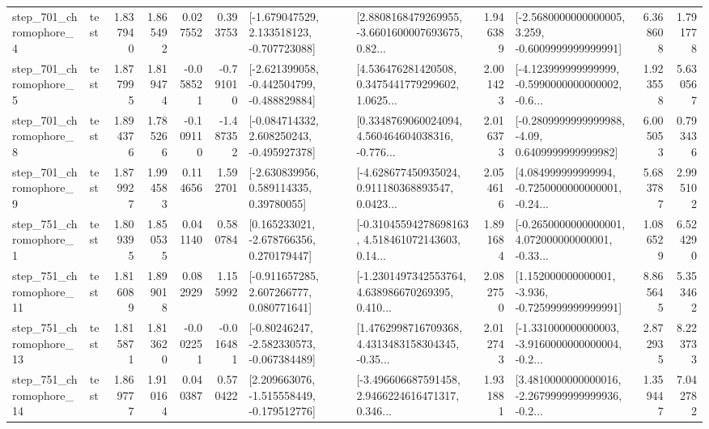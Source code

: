 \begin{tabular}{llrrrrllrlrr}
   step\_701\_chromophore\_4 &      test &      1.837940 &    1.865492 &      0.027552 &  0.393753 &   [-1.679047529, 2.133518123, -0.707723088] &  [2.8808168479269955, -3.6601600007693675, 0.82... &       1.946389 &  [-2.5680000000000005, 3.259, -0.6009999999999991] &            6.368608 &          1.791778 \\
   step\_701\_chromophore\_5 &      test &      1.877995 &    1.819474 &     -0.058521 & -0.791010 &  [-2.621399058, -0.442504799, -0.488829884] &  [4.536476281420508, 0.3475441779299602, 1.0625... &       2.001423 &  [-4.123999999999999, -0.5990000000000002, -0.6... &            1.923558 &          5.630567 \\
   step\_701\_chromophore\_8 &      test &      1.894376 &    1.785266 &     -0.109110 & -1.487352 &   [-0.084714332, 2.608250243, -0.495927378] &  [0.3348769060024094, 4.560464604038316, -0.776... &       2.016373 &   [-0.2809999999999988, -4.09, 0.6409999999999982] &            6.005053 &          0.793436 \\
   step\_701\_chromophore\_9 &      test &      1.879927 &    1.994583 &      0.114656 &  1.592701 &     [-2.630839956, 0.589114335, 0.39780055] &  [-4.628677450935024, 0.911180368893547, 0.0423... &       2.054616 &  [4.084999999999994, -0.7250000000000001, -0.24... &            5.683787 &          2.995102 \\
   step\_751\_chromophore\_1 &      test &      1.809395 &    1.850535 &      0.041140 &  0.580784 &    [0.165233021, -2.678766356, 0.270179447] &  [-0.31045594278698163, 4.518461072143603, 0.14... &       1.891684 &  [-0.2650000000000001, 4.072000000000001, -0.33... &            1.086529 &          6.524290 \\
  step\_751\_chromophore\_11 &      test &      1.816089 &    1.899018 &      0.082929 &  1.155992 &    [-0.911657285, 2.607266777, 0.080771641] &  [-1.2301497342553764, 4.638986670269395, 0.410... &       2.082750 &   [1.152000000000001, -3.936, -0.7259999999999991] &            8.865645 &          5.353462 \\
  step\_751\_chromophore\_13 &      test &      1.815871 &    1.813620 &     -0.002251 & -0.016481 &   [-0.80246247, -2.582330573, -0.067384489] &  [1.4762998716709368, 4.4313483158304345, -0.35... &       2.012743 &  [-1.331000000000003, -3.9160000000000004, -0.2... &            2.872935 &          8.223733 \\
  step\_751\_chromophore\_14 &      test &      1.869777 &    1.910164 &      0.040387 &  0.570422 &   [2.209663076, -1.515558449, -0.179512776] &  [-3.496606687591458, 2.9466224616471317, 0.346... &       1.931881 &  [3.4810000000000016, -2.2679999999999936, -0.2... &            1.359447 &          7.042782 \\

\end{tabular}
